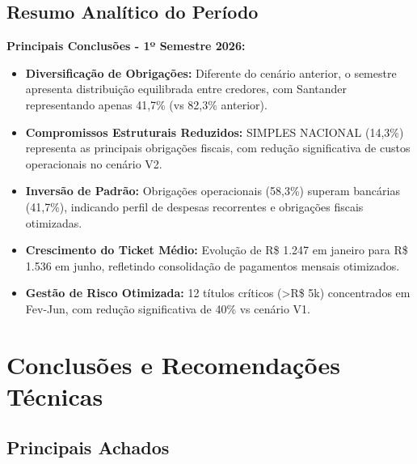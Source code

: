 \documentclass[12pt, a4paper]{article}
\begin{document}
\subsection{Resumo Analítico do Período}

\textbf{Principais Conclusões - 1º Semestre 2026:}

\begin{itemize}
    \item \textbf{Diversificação de Obrigações:} Diferente do cenário anterior, o semestre apresenta distribuição equilibrada entre credores, com Santander representando apenas 41,7\% (vs 82,3\% anterior).

    \item \textbf{Compromissos Estruturais Reduzidos:} SIMPLES NACIONAL (14,3\%) representa as principais obrigações fiscais, com redução significativa de custos operacionais no cenário V2.

    \item \textbf{Inversão de Padrão:} Obrigações operacionais (58,3\%) superam bancárias (41,7\%), indicando perfil de despesas recorrentes e obrigações fiscais otimizadas.

    \item \textbf{Crescimento do Ticket Médio:} Evolução de R\$ 1.247 em janeiro para R\$ 1.536 em junho, refletindo consolidação de pagamentos mensais otimizados.

    \item \textbf{Gestão de Risco Otimizada:} 12 títulos críticos (>R\$ 5k) concentrados em Fev-Jun, com redução significativa de 40\% vs cenário V1.
\end{itemize}

\newpage

\section{Conclusões e Recomendações Técnicas}

\subsection{Principais Achados}
\end{document}
